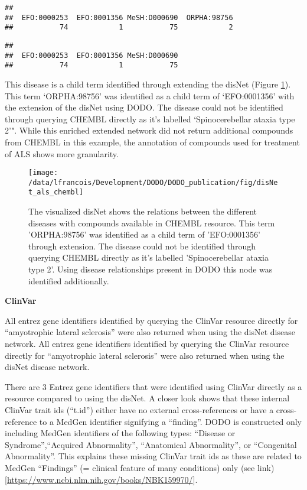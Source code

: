 \documentclass[9pt,a4paper,]{extarticle}
\begin{document}
\begin{verbatim}
## 
##  EFO:0000253  EFO:0001356 MeSH:D000690  ORPHA:98756 
##           74            1           75            2
\end{verbatim}

\begin{verbatim}
## 
##  EFO:0000253  EFO:0001356 MeSH:D000690 
##           74            1           75
\end{verbatim}

This disease is a child term identified through extending the disNet (Figure \ref{fig:disnetALSchembl}). This term `ORPHA:98756' was identified as a child term of `EFO:0001356' with the extension of the disNet using DODO. The disease could not be identified through querying CHEMBL directly as it's labelled `Spinocerebellar ataxia type 2'". While this enriched extended network did not return additional compounds from CHEMBL in this example, the annotation of compounds used for treatment of ALS shows more granularity.

\begin{figure}

{\centering \texttt{[image: /data/lfrancois/Development/DODO/DODO\_publication/fig/disNet\_als\_chembl]} 

}

\caption{The visualized disNet shows the relations between the different diseases with compounds available in CHEMBL resource. This term 'ORPHA:98756' was identified as a child term of 'EFO:0001356' through extension. The disease could not be identified through querying CHEMBL directly as it's labelled 'Spinocerebellar ataxia type 2'. Using disease relationships present in DODO this node was identified additionally.}\label{fig:disnetALSchembl}
\end{figure}

\textbf{ClinVar}

All entrez gene identifiers identified by querying the ClinVar resource directly for ``amyotrophic lateral sclerosis'' were also returned when using the disNet disease network. All entrez gene identifiers identified by querying the ClinVar resource directly for ``amyotrophic lateral sclerosis'' were also returned when using the disNet disease network.

There are 3 Entrez gene identifiers that were identified using ClinVar directly as a resource compared to using the disNet. A closer look shows that these internal ClinVar trait ids (``t.id'') either have no external cross-references or have a cross-reference to a MedGen identifier signifying a ``finding''. DODO is constructed only including MedGen identifiers of the following types: ``Disease or Syndrome'',``Acquired Abnormality'', ``Anatomical Abnormality'', or ``Congenital Abnormality''. This explains these missing ClinVar trait ids as these are related to MedGen ``Findings'' (= clinical feature of many conditions) only (see link){[}\url{https://www.ncbi.nlm.nih.gov/books/NBK159970/}{]}.
\end{document}
